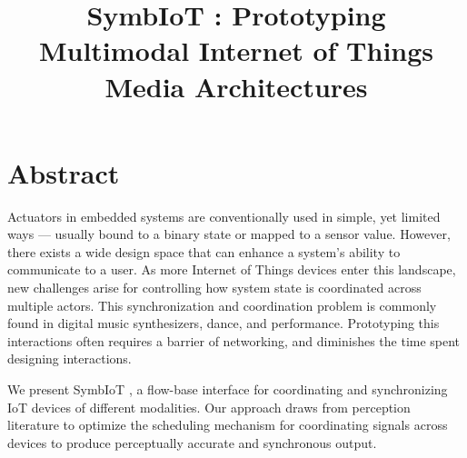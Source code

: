 \documentclass{sigchi}
\newcommand{\expresso}{SymbIoT }
\newcommand*{\schedule}[1]{{\textbf{\small{\fontfamily{cmss}\selectfont{#1}}}}}
\begin{document}
\title{\expresso: Prototyping Multimodal Internet of Things Media Architectures}

\iftoggle{anonymous}{
  \numberofauthors{1}
  \author{
  \alignauthor Anonymous for Submission\\
    \affaddr{...}\\
    \affaddr{...}\\
    \email{...}\\
  }
}{
\numberofauthors{1}
  \author{
  \alignauthor {C\'{e}sar Torres}\\
    \affaddr{Department of Electrical Engineering and Computer Sciences}\\
    \affaddr{University of California Berkeley}\\
    \email{cearto@eecs.berkeley.edu}\\
  }
}
\maketitle
\section{Abstract}
  Actuators in embedded systems are conventionally used in simple, yet limited ways --- usually bound to a binary state or mapped to a sensor value. However, there exists a wide design space that can enhance a system's ability to communicate to a user. As more Internet of Things devices enter this landscape, new challenges arise for controlling how system state is coordinated across multiple actors. This synchronization and coordination problem is commonly found in digital music synthesizers, dance, and performance. Prototyping this interactions often requires a barrier of networking, and diminishes the time spent designing interactions. 

  We present \expresso, a flow-base interface for coordinating and synchronizing IoT devices of different modalities. Our approach draws from perception literature to optimize the scheduling mechanism for coordinating signals across devices to produce perceptually accurate and synchronous output.
\end{document}
